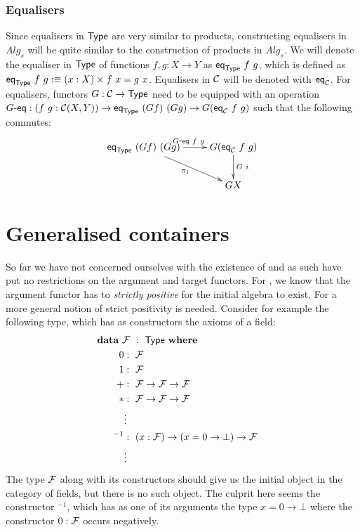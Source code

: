 \documentclass[a4paper,10pt]{article}
\begin{document}
\subsubsection{Equalisers}

Since equalisers in $\mathsf{Type}$ are very similar to products, constructing
equalisers in $Alg_s$ will be quite similar to the construction of
products in $Alg_s$. We will denote the equaliser in $\mathsf{Type}$ of
functions $f, g : X \to Y$ as $\mathsf{eq}_{\mathsf{Type}}\ f\ g$, which is defined as
$\mathsf{eq}_{\mathsf{Type}}\ f\ g :\equiv (x : X) \times f\ x = g\ x$. Equalisers in
$\mathcal{C}$ will be denoted with $\mathsf{eq}_{\mathcal{C}}$. For equalisers, functors
$G : \mathcal{C} \to \mathsf{Type}$ need to be equipped with an operation
$G\mbox{-}\mathsf{eq} : (f\ g : \mathcal{C}(X,Y)) \to \mathsf{eq}_{\mathsf{Type}}\ (G f)\ (G g) \to G (\mathsf{eq}_{\mathcal{C}}\
f\ g)$ such that the following commutes:
$$
\xymatrix{
\eq_{\Type}\ (G f)\ (G g)
 \ar[r]^{\Geq\ f\ g}
 \ar[rd]_{\pi_1}
&G (\eq_{\C}\ f\ g)
 \ar[d]^{G\ i} \\
&GX
}
$$


\section{Generalised containers}
\label{sec:gencontainers}

So far we have not concerned ourselves with the existence of \hits and
as such have put no restrictions on the argument and target
functors. For \oits, we know that the argument functor has to
\emph{strictly positive} for the initial algebra to exist. For \hits a
more general notion of strict positivity is needed. Consider for
example the following type, which has as constructors the axioms of a
field:
%
\begin{alignat*}{2}
&\rlap{$\data\ \initialfield\ :\ \Type\ \where$} \\
&&\ \ 0        &:\ \initialfield \\
&&\ \ 1        &:\ \initialfield \\
&&\ \ +        &:\ \initialfield \to \initialfield \to \initialfield \\
&&\ \ *        &:\ \initialfield \to \initialfield \to \initialfield \\
&&&\vdots \\
&&\ \ ^{-1}     &:\ (x : \initialfield) \to (x = 0 \to \bot) \to \initialfield \\
&&&\vdots
\end{alignat*}
%
The type $\mathcal{F}$ along with its constructors should give us
the initial object in the category of fields, but there is no such
object. The culprit here seems the constructor $^{-1}$, which has as
one of its arguments the type $x = 0 \to \bot$ where the constructor
$0 : \mathcal{F}$ occurs negatively.
\end{document}
